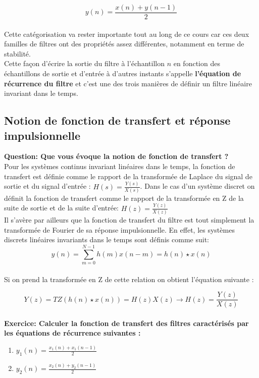 \documentclass[11pt,a4paper]{article}
\begin{document}
\[ y(n) = \frac{x(n) + y(n-1)}{2}  \]\\

Cette catégorisation va rester importante tout au long de ce cours car ces deux familles de filtres ont des propriétés assez différentes, notamment en terme de stabilité.\\

Cette façon d'écrire la sortie du filtre à l'échantillon $n$ en fonction des échantillons de sortie et d'entrée à d'autres instants s'appelle \textbf{l'équation de récurrence du filtre} et c'est une des trois manières de définir un filtre linéaire invariant dans le temps.  

\subsection{Notion de fonction de transfert et réponse impulsionnelle} 

\textbf{Question: Que vous évoque la notion de fonction de transfert ?}\\

Pour les systèmes continus invariant linéaires dans le temps, la fonction de transfert est définie comme le rapport de la transformée de Laplace du signal de sortie et du signal d'entrée : $H(s) = \frac{Y(s)}{X(s)}$. Dans le cas d'un système discret on définit la fonction de transfert comme le rapport de la transformée en Z de la suite de sortie et de la suite d'entrée: $H(z) = \frac{Y(z)}{X(z)}$\\

Il s'avère par ailleurs que la fonction de transfert du filtre est tout simplement la transformée de Fourier de sa réponse impulsionnelle. En effet, les systèmes discrets linéaires invariants dans le temps sont définis comme suit:\\

\[ y(n) = \sum_{m = 0}^{N-1} h(m) x(n-m) =  h(n)\star x(n) \]\\ 

Si on prend la transformée en Z de cette relation on obtient l'équation suivante :

\[ Y(z) = TZ(h(n)\star x(n)) =  H(z) X(z) \rightarrow  H(z) = \frac{Y(z)}{X(z)}\]\\ 

\textbf{Exercice: Calculer la fonction de transfert des filtres caractérisés par les équations de récurrence suivantes :}\\
\begin{enumerate}
\item  $y_1(n) = \frac{x_1(n) + x_1(n-1)}{2}$
\item  $y_2(n) = \frac{x_2(n) + y_2(n-1)}{2}$
\end{enumerate}
\end{document}

